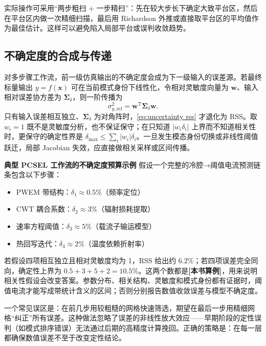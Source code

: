 实际操作可采用“两步粗扫 + 一步精扫”：先在较大步长下确定大致平台区，然后在平台区内做一次精细扫描，最后用 Richardson 外推或直接取平台区的平均值作为最佳估计。这样可以避免陷入局部平台或误判收敛趋势。

\subsection{不确定度的合成与传递}
对多步骤工作流，前一级仿真输出的不确定度会成为下一级输入的误差源。若最终标量输出 $y=f(\bm x)$ 可在当前模式身份下线性化，令相对灵敏度向量为 $\bm w$、输入相对误差协方差为 $\bm\Sigma_\delta$，则一阶传播为
\begin{equation}
\sigma_{y,\mathrm{rel}}^2
=
\bm w^{\mathsf T}\bm\Sigma_\delta\bm w.
\label{eq:uncertainty rss}
\end{equation}
只有输入误差相互独立、$\bm\Sigma_\delta$ 为对角阵时，\cref{eq:uncertainty rss} 才退化为 RSS。取 $w_i=1$ 既不是灵敏度分析，也不保证保守；在只知道 $|w_i\delta_i|$ 上界而不知道相关性时，更保守的确定性界是 $\delta_{\max}\le\sum_i|w_i|\delta_i$。一旦发生模态身份切换或非线性阈值跃迁，局部 Jacobian 失效，应直接做相关采样或区间传播。

\begin{NumericalErrorBox}
\textbf{典型 PCSEL 工作流的不确定度预算示例}
假设一个完整的冷腔→阈值电流预测链条包含以下步骤：
\begin{itemize}
  \item PWEM 带结构：$\delta_1 \approx 0.5\%$（频率定位）
  \item CWT 耦合系数：$\delta_2 \approx 3\%$（辐射损耗提取）
  \item 速率方程阈值：$\delta_3 \approx 5\%$（载流子输运模型）
  \item 热回写迭代：$\delta_4 \approx 2\%$（温度依赖折射率）
\end{itemize}
若假设四项相互独立且相对灵敏度均为 1，RSS 给出约 $6.2\%$；若四项误差完全同向，确定性上界为 $0.5+3+5+2=10.5\%$。这两个数都是\textbf{[本书算例]}，用来说明相关性假设会改变答案。参数分布、相关结构、灵敏度和模式身份都有证据时，阈值电流才能写成带统计含义的区间；否则分别报告数值收敛误差与模型不确定度。
\end{NumericalErrorBox}

\begin{WhatCouldGoWrong}
一个常见误区是：在前几步用较粗糙的网格快速筛选，期望在最后一步用精细网格“纠正”所有误差。这种做法忽略了误差的非线性放大效应——早期阶段的定性误判（如模式排序错误）无法通过后期的高精度计算挽回。正确的策略是：在每一层都确保数值误差不至于改变定性结论。
\end{WhatCouldGoWrong}

